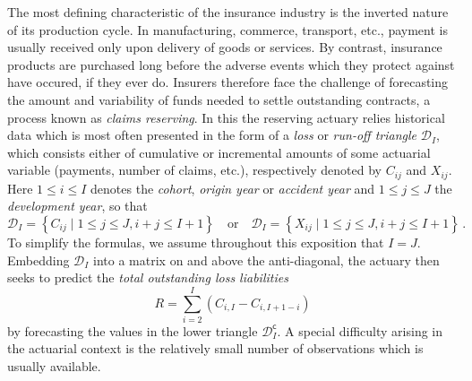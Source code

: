 \documentclass[a4paper]{book}
\begin{document}
The most defining characteristic of the insurance industry is the inverted nature of its production cycle. In manufacturing, commerce, transport, etc., payment is usually received only upon delivery of goods or services. By contrast, insurance products are purchased long before the adverse events which they protect against have occured, if they ever do. Insurers therefore face the challenge of forecasting the amount and variability of funds needed to settle outstanding contracts, a process known as \emph{claims reserving}. In this the reserving actuary relies historical data which is most often presented in the form of a \emph{loss} or \emph{run-off triangle} $\mathcal{D}_I$, which consists either of cumulative or incremental amounts of some actuarial variable (payments, number of claims, etc.), respectively denoted by $C_{ij}$ and $X_{ij}$. Here $1 \leq i \leq I$ denotes the \emph{cohort}, \emph{origin year} or \emph {accident year} and $1 \leq j \leq J$ the \emph{development year}, so that
\begin{equation}
    \mathcal{D}_I = \left  \{ C_{ij} \mid 1 \leq j \leq J, i + j \leq I + 1 \right \} 
    \quad \text{or} \quad 
    \mathcal{D}_I = \left  \{ X_{ij} \mid 1 \leq j \leq J, i + j \leq I + 1 \right \} \,.
\end{equation}
To simplify the formulas, we assume throughout this exposition that $I = J$. Embedding $\mathcal{D}_I$ into a matrix on and above the anti-diagonal, the actuary then seeks to predict the \emph{total outstanding loss liabilities}
\begin{equation}
    R = \sum_{i = 2}^I (C_{i, I} - C_{i, I + 1- i})
\end{equation}
by forecasting the values in the lower triangle $\mathcal{D}^{\mathsf{c}}_I$. A special difficulty arising in the actuarial context is the relatively small number of observations which is usually available.
\end{document}

